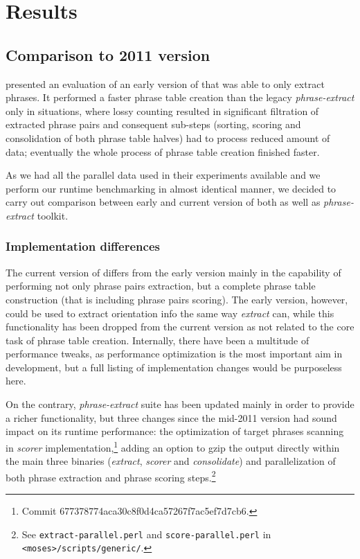 \chapter{Results}
\label{chap:results}

\section{Comparison to 2011 version}

\citet{przywara:eppex} presented an evaluation of an early version of \eppex{}
that was able to only extract phrases. It performed a faster phrase
table creation than the legacy \emph{phrase-extract} only in situations,
where lossy counting resulted in significant filtration of extracted phrase
pairs and consequent sub-steps (sorting, scoring and consolidation of both
phrase table halves) had to process reduced amount of data;
eventually the whole process of phrase table creation finished faster.

As we had all the parallel data used in their experiments available and
we perform our runtime benchmarking in almost identical manner,
we decided to carry out comparison between early and current version of
both \eppex{} as well as \emph{phrase-extract} toolkit.

\subsection{Implementation differences}

The current version of \eppex{} differs from the early version mainly in the
capability of performing not only phrase pairs extraction, but a complete
phrase table construction (that is including phrase pairs scoring).
The early version, however, could be used to extract orientation info
the same way \emph{extract} can, while this functionality has been dropped
from the current version as not related to the core task of phrase table creation.
Internally, there have been a multitude of performance tweaks,
as performance optimization is the most important aim in \eppex{} development,
but a full listing of implementation changes would be purposeless here.

On the contrary, \emph{phrase-extract} suite has been updated mainly in order to
provide a richer functionality, but three changes since the mid-2011 version
had sound impact on its runtime performance: the optimization of target phrases
scanning in \emph{scorer} implementation,\footnote{Commit 677378774aca30c8f0d4ca57267f7ac5ef7d7cb6.}
adding an option to gzip the output directly within the main three binaries
(\emph{extract}, \emph{scorer} and \emph{consolidate})
and parallelization of both phrase extraction and phrase scoring
steps.\footnote{See \texttt{extract-parallel.perl} and \texttt{score-parallel.perl}
in \texttt{<moses>/scripts/generic/}.}

